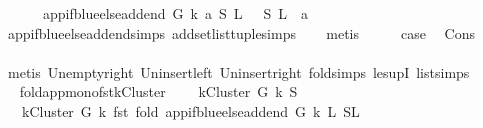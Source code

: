 \begin{isabellebody}
\ \ \ \ {\isacharbar}{\kern0pt}\ \ {\isachardoublequoteopen}{\isacharparenleft}{\kern0pt}app{\isacharunderscore}{\kern0pt}if{\isacharunderscore}{\kern0pt}blue{\isacharunderscore}{\kern0pt}else{\isacharunderscore}{\kern0pt}add{\isacharunderscore}{\kern0pt}end\ G\ k\ a\ {\isacharparenleft}{\kern0pt}S{\isacharcomma}{\kern0pt}\ L{}{\isacharparenright}{\kern0pt}{\isacharparenright}{\kern0pt}\ {\isacharequal}{\kern0pt}\ \ {\isacharparenleft}{\kern0pt}S{\isacharcomma}{\kern0pt}\ L{}\ {\isacharat}{\kern0pt}\ {\isacharbrackleft}{\kern0pt}a{\isacharbrackright}{\kern0pt}{\isacharparenright}{\kern0pt}{\isachardoublequoteclose}\isanewline
\ \ \isamarkupfalse%
\ app{\isacharunderscore}{\kern0pt}if{\isacharunderscore}{\kern0pt}blue{\isacharunderscore}{\kern0pt}else{\isacharunderscore}{\kern0pt}add{\isacharunderscore}{\kern0pt}end{\isachardot}{\kern0pt}simps\ add{\isacharunderscore}{\kern0pt}set{\isacharunderscore}{\kern0pt}list{\isacharunderscore}{\kern0pt}tuple{\isachardot}{\kern0pt}simps\isanewline
\ \ \isamarkupfalse%
\ metis\isanewline
\ \ \isamarkupfalse%
\ \isamarkupfalse%
\ {\isacharquery}{\kern0pt}case\ \isamarkupfalse%
\ Cons\isanewline
\ \ \ \ \isamarkupfalse%
\ {\isacharparenleft}{\kern0pt}metis\ Un{\isacharunderscore}{\kern0pt}empty{\isacharunderscore}{\kern0pt}right\ Un{\isacharunderscore}{\kern0pt}insert{\isacharunderscore}{\kern0pt}left\ Un{\isacharunderscore}{\kern0pt}insert{\isacharunderscore}{\kern0pt}right\ fold{\isacharunderscore}{\kern0pt}simps{\isacharparenleft}{\kern0pt}{}{\isacharparenright}{\kern0pt}\ le{\isacharunderscore}{\kern0pt}supI{}\ list{\isachardot}{\kern0pt}simps{\isacharparenleft}{\kern0pt}{}{}{\isacharparenright}{\kern0pt}{\isacharparenright}{\kern0pt}\ \ \ \ \ \ \isanewline
{}\isamarkupfalse%
%
\endisatagproof
{\isafoldproof}%
%
\isadelimproof
\isanewline
%
\endisadelimproof
\isanewline
\isanewline
{}\isamarkupfalse%
\ fold{\isacharunderscore}{\kern0pt}app{\isacharunderscore}{\kern0pt}mono{\isacharunderscore}{\kern0pt}fst{\isacharunderscore}{\kern0pt}kCluster{\isacharcolon}{\kern0pt}\ \isanewline
\ \ \ {\isachardoublequoteopen}kCluster\ G\ k\ S{\isachardoublequoteclose}\isanewline
\ \ \ {\isachardoublequoteopen}kCluster\ G\ k\ {\isacharparenleft}{\kern0pt}fst\ {\isacharparenleft}{\kern0pt}fold\ {\isacharparenleft}{\kern0pt}app{\isacharunderscore}{\kern0pt}if{\isacharunderscore}{\kern0pt}blue{\isacharunderscore}{\kern0pt}else{\isacharunderscore}{\kern0pt}add{\isacharunderscore}{\kern0pt}end\ G\ k{\isacharparenright}{\kern0pt}\ L{}\ {\isacharparenleft}{\kern0pt}S{\isacharcomma}{\kern0pt}L{}{\isacharparenright}{\kern0pt}{\isacharparenright}{\kern0pt}{\isacharparenright}{\kern0pt}{\isachardoublequoteclose}\ \isanewline

\end{isabellebody}
